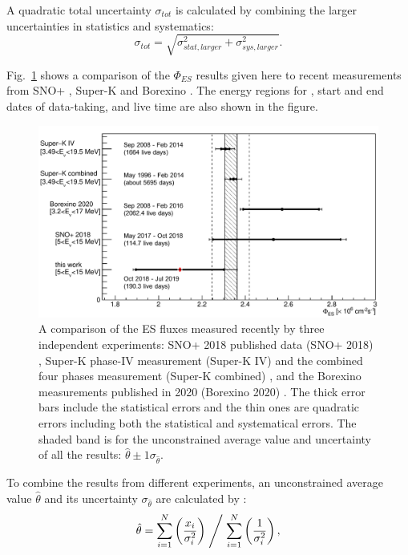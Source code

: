 A quadratic total uncertainty $\sigma_{tot}$ is calculated by combining the larger uncertainties in statistics and systematics:
\begin{equation}
\sigma_{tot}=\sqrt{\sigma^2_{stat,larger}+\sigma^2_{sys,larger}}.
\end{equation}

Fig.~\ref{fig:ESfluxCompare} shows a comparison of the $\Phi_{ES}$ results given here to recent measurements from SNO+ \cite{anderson2019measurement}, Super-K \cite{abe2016solar} and Borexino \cite{agostini2020improved}. The energy regions for , start and end dates of data-taking, and live time are also shown in the figure.
 
\begin{figure}[!htb]
	\centering
	\includegraphics[width=12cm]{ESfluxCompare.png}
	\caption[A comparison of the ES flux measured recently by three independent experiments.]{A comparison of the ES fluxes measured recently by three independent experiments: SNO+ 2018 published data (SNO+ 2018) \cite{anderson2019measurement}, Super-K phase-IV measurement (Super-K IV) and the combined four phases measurement (Super-K combined) \cite{abe2016solar}, and the Borexino measurements published in 2020 (Borexino 2020) \cite{agostini2020improved}. The thick error bars include the statistical errors and the thin ones are quadratic errors including both the statistical and systematical errors. The shaded band is for the unconstrained average value and uncertainty of all the results: $\hat \theta \pm 1\sigma_{\hat \theta}$.\label{fig:ESfluxCompare}}
\end{figure}

To combine the results from different experiments, an unconstrained average value $\hat \theta$ and its uncertainty $\sigma_{\hat\theta}$ are calculated by \cite{pdg2020,behnke2013data}:
\begin{equation}
\hat \theta = \sum_{i=1}^{N} \left(\frac{x_i}{\sigma_i^2}\right)\Biggm/\sum_{i=1}^{N}\left(\frac{1}{\sigma_i^2}\right),
\end{equation}

